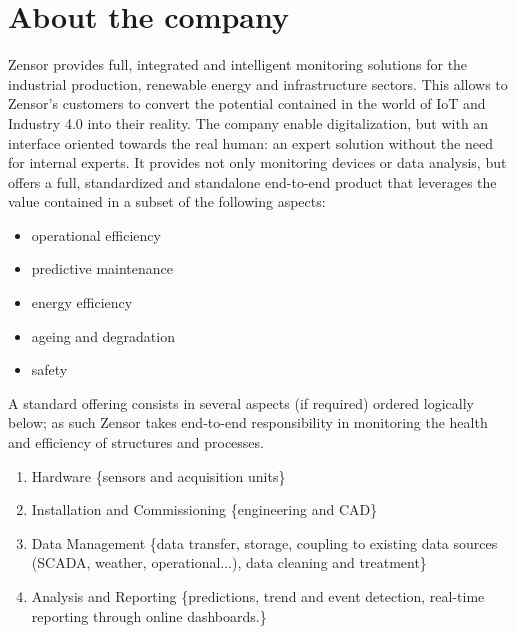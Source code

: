 \section{About the company}
Zensor \cite{Misc:zensor_official_website} provides full, integrated and intelligent monitoring solutions for the industrial production, renewable energy and infrastructure sectors.
This allows to Zensor's customers to convert the potential contained in the world of \ac{IoT} and Industry 4.0 into their reality. 
The company enable digitalization, but with an interface oriented towards the real human: an expert solution without the need for internal experts.
It provides not only monitoring devices or data analysis, but offers a full, standardized and standalone end-to-end product that leverages the value contained in a subset of the following aspects:
\begin{itemize}
    \item operational efficiency
    \item predictive maintenance
    \item energy efficiency
    \item ageing and degradation
    \item safety 
\end{itemize}
A standard offering consists in several aspects (if required) ordered logically below; as such Zensor takes end-to-end responsibility in monitoring the health and efficiency of structures and processes.
\begin{enumerate}
    \item Hardware \{sensors and acquisition units\}
    \item Installation and Commissioning \{engineering and CAD\}
    \item Data Management \{data transfer, storage, coupling to existing data sources (SCADA, weather, operational...), data cleaning and treatment\}
    \item Analysis and Reporting \{predictions, trend and event detection, real-time reporting through online dashboards.\}
\end{enumerate}
